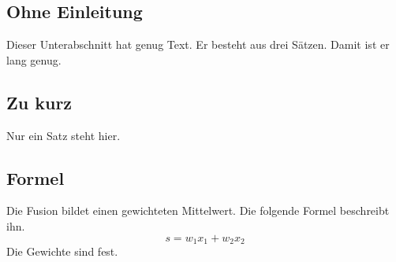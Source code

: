 \subsection{Ohne Einleitung}

Dieser Unterabschnitt hat genug Text.
Er besteht aus drei Sätzen.
Damit ist er lang genug.

\subsection{Zu kurz} %

Nur ein Satz steht hier.

\subsection{Formel}
\label{subsec:formel}

Die Fusion bildet einen gewichteten Mittelwert.
Die folgende Formel beschreibt ihn.
\begin{equation} %
    s = w_1 x_1 + w_2 x_2
\end{equation}
Die Gewichte sind fest.

